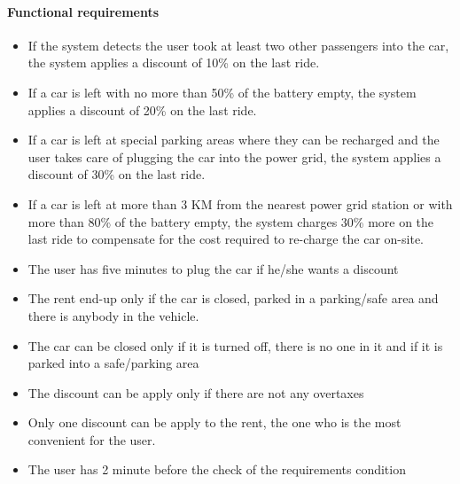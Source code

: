\paragraph{Functional requirements }
\begin{itemize}
	\item If the system detects the user took at least two other passengers into the car, the system applies a discount of 10\% on the last ride.
	\item If a car is left with no more than 50\% of the battery empty, the system applies a discount of 20\% on the last ride.
	\item If a car is left at special parking areas where they can be recharged and the user takes care of plugging the car into the power grid, the system applies a discount of 30\% on the last ride.
	\item If a car is left at more than 3 KM from the nearest power grid station or with more than 80\% of the battery empty, the system charges 30\% more on the last ride to compensate for the cost required to re-charge the car on-site.
	\item The user has five minutes to plug the car if he/she wants a discount
	\item The rent end-up only if the car is closed, parked in a parking/safe area and there is anybody in the vehicle.
	\item The car can be closed only if it is turned off, there is no one in it and if it is parked into a safe/parking area
	\item The discount can be apply only if there are not any overtaxes
	\item Only one discount can be apply to the rent, the one who is the most convenient for the user.
	\item The user has 2 minute before the check of the requirements condition
\end{itemize}
\newpage

